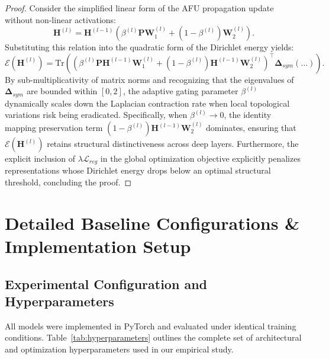 \documentclass[10pt,twocolumn]{article}
\begin{document}
\begin{proof}
Consider the simplified linear form of the \textsc{AFU} propagation update without non-linear activations:
\begin{equation}
\mathbf{H}^{(l)} = \mathbf{H}^{(l-1)} \left( \beta^{(l)} \mathbf{P} \mathbf{W}_1^{(l)} + (1 - \beta^{(l)}) \mathbf{W}_2^{(l)} \right).
\end{equation}
Substituting this relation into the quadratic form of the Dirichlet energy yields:
\begin{equation}
\mathcal{E}(\mathbf{H}^{(l)}) = \text{Tr}\left( \left( \beta^{(l)} \mathbf{P} \mathbf{H}^{(l-1)} \mathbf{W}_1^{(l)} + (1 - \beta^{(l)}) \mathbf{H}^{(l-1)} \mathbf{W}_2^{(l)} \right)^\top \mathbf{\Delta}_{sym} \left( \dots \right) \right).
\end{equation}
By sub-multiplicativity of matrix norms and recognizing that the eigenvalues of $\mathbf{\Delta}_{sym}$ are bounded within $[0, 2]$, the adaptive gating parameter $\beta^{(l)}$ dynamically scales down the Laplacian contraction rate when local topological variations risk being eradicated. Specifically, when $\beta^{(l)} \to 0$, the identity mapping preservation term $(1 - \beta^{(l)}) \mathbf{H}^{(l-1)} \mathbf{W}_2^{(l)}$ dominates, ensuring that $\mathcal{E}(\mathbf{H}^{(l)})$ retains structural distinctiveness across deep layers. Furthermore, the explicit inclusion of $\lambda \mathcal{L}_{reg}$ in the global optimization objective explicitly penalizes representations whose Dirichlet energy drops below an optimal structural threshold, concluding the proof.
\end{proof}

\section{Detailed Baseline Configurations \& Implementation Setup}
\subsection{Experimental Configuration and Hyperparameters}
All models were implemented in PyTorch and evaluated under identical training conditions. Table~\ref{tab:hyperparameters} outlines the complete set of architectural and optimization hyperparameters used in our empirical study.
\end{document}
